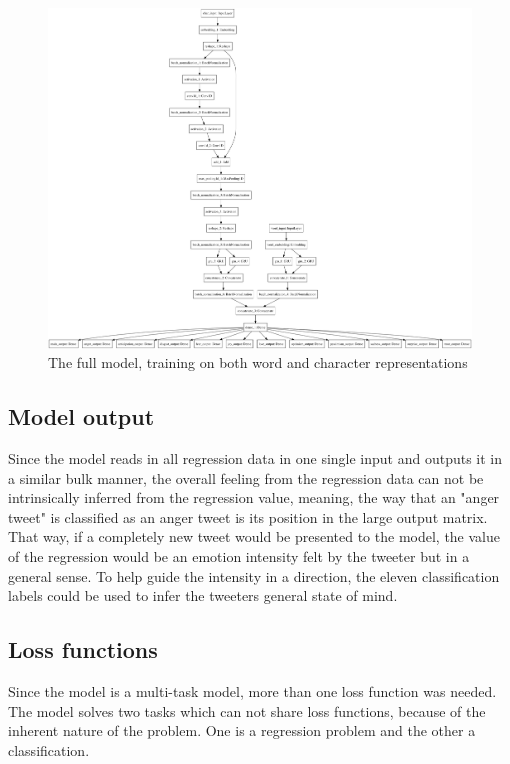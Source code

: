 \begin{figure}[H]
    \centering
        \includegraphics[width=\textwidth]{pictures/model.png}
        \caption{The full model, training on both word and character representations}
        \label{fig:fullmodel}
\end{figure}

\subsection{Model output}
Since the model reads in all regression data in one single input and outputs it in a similar bulk manner, the overall feeling from the regression data can not be intrinsically inferred from the regression value, meaning, the way that an "anger tweet" is classified as an anger tweet is its position in the large output matrix. That way, if a completely new tweet would be presented to the model, the value of the regression would be an emotion intensity felt by the tweeter but in a general sense. To help guide the intensity in a direction, the eleven classification labels could be used to infer the tweeters general state of mind. 

\subsection{Loss functions}
Since the model is a multi-task model, more than one loss function was needed. The model solves two tasks which can not share loss functions, because of the inherent nature of the problem. One is a regression problem and the other a classification.

